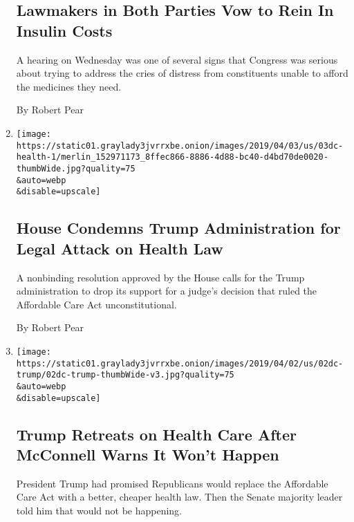 \begin{enumerate}
{  \subsection{Lawmakers in Both Parties Vow to Rein In Insulin
  Costs}\label{lawmakers-in-both-parties-vow-to-rein-in-insulin-costs}}

  A hearing on Wednesday was one of several signs that Congress was
  serious about trying to address the cries of distress from
  constituents unable to afford the medicines they need.

  By Robert Pear
\item
  \href{/2019/04/03/us/politics/trump-obamacare.html}{}

  \texttt{[image: https://static01.graylady3jvrrxbe.onion/images/2019/04/03/us/03dc-health-1/merlin\_152971173\_8ffec866-8886-4d88-bc40-d4bd70de0020-thumbWide.jpg?quality=75\\\&auto=webp\\\&disable=upscale]}

  \hypertarget{house-condemns-trump-administration-for-legal-attack-on-health-law}{%
  \subsection{House Condemns Trump Administration for Legal Attack on
  Health
  Law}\label{house-condemns-trump-administration-for-legal-attack-on-health-law}}

  A nonbinding resolution approved by the House calls for the Trump
  administration to drop its support for a judge's decision that ruled
  the Affordable Care Act unconstitutional.

  By Robert Pear
\item
  \href{/2019/04/02/us/politics/obamacare-donald-trump.html}{}

  \texttt{[image: https://static01.graylady3jvrrxbe.onion/images/2019/04/02/us/02dc-trump/02dc-trump-thumbWide-v3.jpg?quality=75\\\&auto=webp\\\&disable=upscale]}

  \hypertarget{trump-retreats-on-health-care-after-mcconnell-warns-it-wont-happen}{%
  \subsection{Trump Retreats on Health Care After McConnell Warns It
  Won't
  Happen}\label{trump-retreats-on-health-care-after-mcconnell-warns-it-wont-happen}}

  President Trump had promised Republicans would replace the Affordable
  Care Act with a better, cheaper health law. Then the Senate majority
  leader told him that would not be happening.


\end{enumerate}

